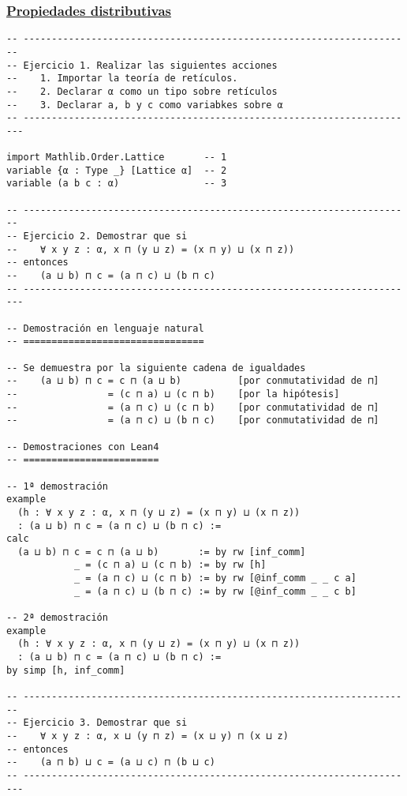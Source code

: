 \subsubsection{\href{./src/Basicos/Propiedades\_distributivas.lean}{Propiedades distributivas}}
\label{sec:org8612539}
\begin{verbatim}
-- ---------------------------------------------------------------------
-- Ejercicio 1. Realizar las siguientes acciones
--    1. Importar la teoría de retículos.
--    2. Declarar α como un tipo sobre retículos
--    3. Declarar a, b y c como variabkes sobre α
-- ----------------------------------------------------------------------

import Mathlib.Order.Lattice       -- 1
variable {α : Type _} [Lattice α]  -- 2
variable (a b c : α)               -- 3

-- ---------------------------------------------------------------------
-- Ejercicio 2. Demostrar que si
--    ∀ x y z : α, x ⊓ (y ⊔ z) = (x ⊓ y) ⊔ (x ⊓ z))
-- entonces
--    (a ⊔ b) ⊓ c = (a ⊓ c) ⊔ (b ⊓ c)
-- ----------------------------------------------------------------------

-- Demostración en lenguaje natural
-- ================================

-- Se demuestra por la siguiente cadena de igualdades
--    (a ⊔ b) ⊓ c = c ⊓ (a ⊔ b)          [por conmutatividad de ⊓]
--                = (c ⊓ a) ⊔ (c ⊓ b)    [por la hipótesis]
--                = (a ⊓ c) ⊔ (c ⊓ b)    [por conmutatividad de ⊓]
--                = (a ⊓ c) ⊔ (b ⊓ c)    [por conmutatividad de ⊓]

-- Demostraciones con Lean4
-- ========================

-- 1ª demostración
example
  (h : ∀ x y z : α, x ⊓ (y ⊔ z) = (x ⊓ y) ⊔ (x ⊓ z))
  : (a ⊔ b) ⊓ c = (a ⊓ c) ⊔ (b ⊓ c) :=
calc
  (a ⊔ b) ⊓ c = c ⊓ (a ⊔ b)       := by rw [inf_comm]
            _ = (c ⊓ a) ⊔ (c ⊓ b) := by rw [h]
            _ = (a ⊓ c) ⊔ (c ⊓ b) := by rw [@inf_comm _ _ c a]
            _ = (a ⊓ c) ⊔ (b ⊓ c) := by rw [@inf_comm _ _ c b]

-- 2ª demostración
example
  (h : ∀ x y z : α, x ⊓ (y ⊔ z) = (x ⊓ y) ⊔ (x ⊓ z))
  : (a ⊔ b) ⊓ c = (a ⊓ c) ⊔ (b ⊓ c) :=
by simp [h, inf_comm]

-- ---------------------------------------------------------------------
-- Ejercicio 3. Demostrar que si
--    ∀ x y z : α, x ⊔ (y ⊓ z) = (x ⊔ y) ⊓ (x ⊔ z)
-- entonces
--    (a ⊓ b) ⊔ c = (a ⊔ c) ⊓ (b ⊔ c)
-- ----------------------------------------------------------------------


\end{verbatim}
